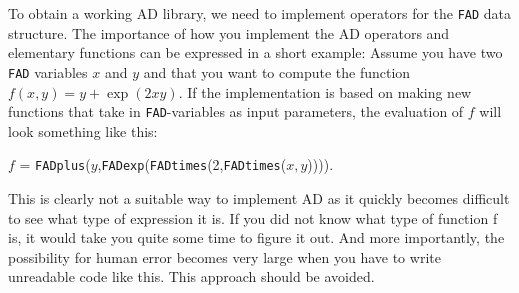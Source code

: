 To obtain a working AD library, we need to implement operators for the \texttt{FAD} data structure. The importance of how you implement the AD operators and elementary functions can be expressed in a short example: Assume you have two \texttt{FAD} variables $x$ and $y$ and that you want to compute the function $f(x,y) = y+\exp(2xy)$. If the implementation is based on making new functions that take in \texttt{FAD}-variables as input parameters, the evaluation of $f$ will look something like this: 
\begin{center}
    $f$ = \texttt{FADplus}($y$,\texttt{FADexp}(\texttt{FADtimes}(2,\texttt{FADtimes}($x,y$)))).
\end{center}
This is clearly not a suitable way to implement AD as it quickly becomes difficult to see what type of expression it is. If you did not know what type of function f is, it would take you quite some time to figure it out. And more importantly, the possibility for human error becomes very large when you have to write unreadable code like this. This approach should be avoided. 

